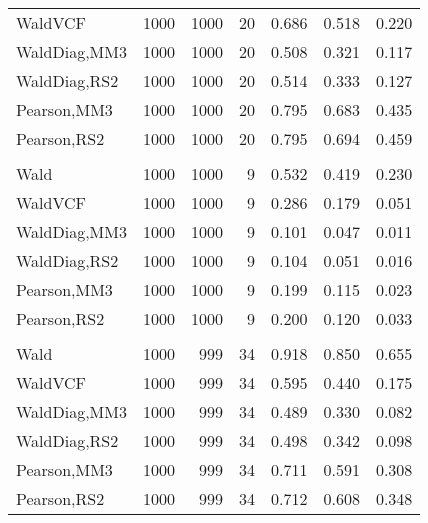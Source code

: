 \documentclass[
]{article}
\begin{document}
\begin{table}[H]
{\begin{tabular}[t]{lrrrrrr}
\hspace{1em}WaldVCF & 1000 & 1000 & 20 & 0.686 & 0.518 & 0.220\\
\hspace{1em}WaldDiag,MM3 & 1000 & 1000 & 20 & 0.508 & 0.321 & 0.117\\
\hspace{1em}WaldDiag,RS2 & 1000 & 1000 & 20 & 0.514 & 0.333 & 0.127\\
\hspace{1em}Pearson,MM3 & 1000 & 1000 & 20 & 0.795 & 0.683 & 0.435\\
\hspace{1em}Pearson,RS2 & 1000 & 1000 & 20 & 0.795 & 0.694 & 0.459\\
\addlinespace[0.3em]
\multicolumn{7}{l}{\textbf{2F 10V}}\\
\hspace{1em}Wald & 1000 & 1000 & 9 & 0.532 & 0.419 & 0.230\\
\hspace{1em}WaldVCF & 1000 & 1000 & 9 & 0.286 & 0.179 & 0.051\\
\hspace{1em}WaldDiag,MM3 & 1000 & 1000 & 9 & 0.101 & 0.047 & 0.011\\
\hspace{1em}WaldDiag,RS2 & 1000 & 1000 & 9 & 0.104 & 0.051 & 0.016\\
\hspace{1em}Pearson,MM3 & 1000 & 1000 & 9 & 0.199 & 0.115 & 0.023\\
\hspace{1em}Pearson,RS2 & 1000 & 1000 & 9 & 0.200 & 0.120 & 0.033\\
\addlinespace[0.3em]
\multicolumn{7}{l}{\textbf{3F 15V}}\\
\hspace{1em}Wald & 1000 & 999 & 34 & 0.918 & 0.850 & 0.655\\
\hspace{1em}WaldVCF & 1000 & 999 & 34 & 0.595 & 0.440 & 0.175\\
\hspace{1em}WaldDiag,MM3 & 1000 & 999 & 34 & 0.489 & 0.330 & 0.082\\
\hspace{1em}WaldDiag,RS2 & 1000 & 999 & 34 & 0.498 & 0.342 & 0.098\\
\hspace{1em}Pearson,MM3 & 1000 & 999 & 34 & 0.711 & 0.591 & 0.308\\
\hspace{1em}Pearson,RS2 & 1000 & 999 & 34 & 0.712 & 0.608 & 0.348\\
\bottomrule
\end{tabular}}
\endgroup{}
\end{table}
\end{document}
